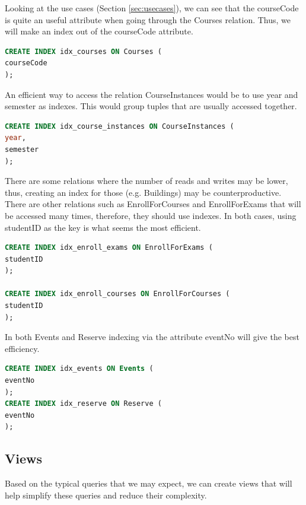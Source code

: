 \documentclass{article}
\begin{document}
Looking at the use cases (Section \ref{sec:usecases}), we can see that the courseCode is quite an useful attribute when going through the Courses relation. Thus, we will make an index out of the courseCode attribute.
\begin{lstlisting}[language=SQL]
CREATE INDEX idx_courses ON Courses (
courseCode
);
\end{lstlisting}

An efficient way to access the relation CourseInstances would be to use year and semester as indexes. This would group tuples that are usually accessed together.
\begin{lstlisting}[language=SQL]
CREATE INDEX idx_course_instances ON CourseInstances (
year,
semester
);
\end{lstlisting}

There are some relations where the number of reads and writes may be lower, thus, creating an index for those (e.g. Buildings) may be counterproductive.
There are other relations such as EnrollForCourses and EnrollForExams that will be accessed many times, therefore, they should use indexes. 
In both cases, using studentID as the key is what seems the most efficient.
\begin{lstlisting}[language=SQL]
CREATE INDEX idx_enroll_exams ON EnrollForExams (
studentID
);

CREATE INDEX idx_enroll_courses ON EnrollForCourses (
studentID
);
\end{lstlisting}

In both Events and Reserve indexing via the attribute eventNo will give the best efficiency.
\begin{lstlisting}[language=SQL]
CREATE INDEX idx_events ON Events (
eventNo
);
CREATE INDEX idx_reserve ON Reserve (
eventNo
);
\end{lstlisting}


\subsection{Views}
Based on the typical queries that we may expect, we can create views that will help simplify these queries and reduce their complexity.
\end{document}
